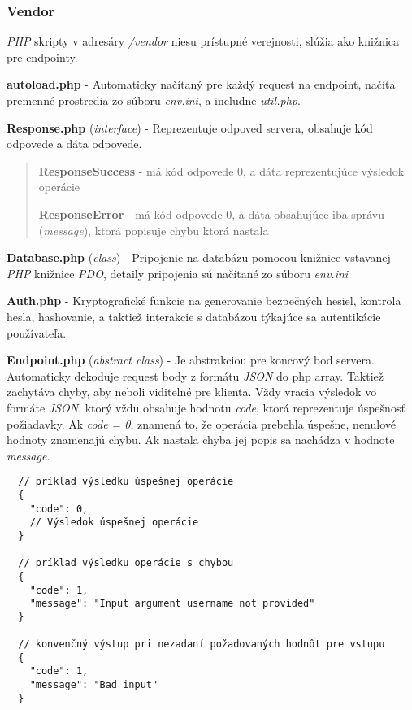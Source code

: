 \documentclass{article}
\newcommand{\filedesc}[1]{\vspace{0.3cm} \noindent \textbf{#1}}
\newcommand{\file}[1]{\emph{#1}}
\begin{document}
\subsubsection{Vendor}


\emph{PHP} skripty v adresáry \file{/vendor} niesu prístupné verejnosti, slúžia ako knižnica pre endpointy.

\filedesc{autoload.php} - Automaticky načítaný pre každý request na endpoint, načíta premenné prostredia zo súboru \file{env.ini}, a includne \file{util.php}.

\filedesc{Response.php} (\emph{interface}) - Reprezentuje odpoveď servera, obsahuje kód odpovede a dáta odpovede.
\begin{quote}
  \filedesc{ResponseSuccess} - má kód odpovede 0, a dáta reprezentujúce výsledok operácie

  \filedesc{ResponseError} - má kód odpovede 0, a dáta obsahujúce iba správu (\emph{message}), ktorá popisuje chybu ktorá nastala
\end{quote}

\filedesc{Database.php} (\emph{class}) - Pripojenie na databázu pomocou knižnice vstavanej \emph{PHP} knižnice \emph{PDO}, detaily pripojenia sú načítané zo súboru \file{env.ini}

\filedesc{Auth.php} - Kryptografické funkcie na generovanie bezpečných hesiel, kontrola hesla, hashovanie, a taktiež interakcie s databázou týkajúce sa autentikácie používateľa.

\filedesc{Endpoint.php} (\emph{abstract class}) - Je abstrakciou pre koncový bod servera. Automaticky dekoduje request body z formátu \emph{JSON} do php array. Taktiež zachytáva chyby, aby neboli viditelné pre klienta. Vždy vracia výsledok vo formáte \emph{JSON}, ktorý vždu obsahuje hodnotu \emph{code}, ktorá reprezentuje úspešnosť požiadavky. Ak \emph{code = 0}, znamená to, že operácia prebehla úspešne, nenulové hodnoty znamenajú chybu. Ak nastala chyba jej popis sa nachádza v hodnote \emph{message}.

\begin{verbatim}
  // príklad výsledku úspešnej operácie
  {
    "code": 0,
    // Výsledok úspešnej operácie 
  }

  // príklad výsledku operácie s chybou
  {
    "code": 1,
    "message": "Input argument username not provided"
  }

  // konvenčný výstup pri nezadaní požadovaných hodnôt pre vstupu
  {
    "code": 1,
    "message": "Bad input"
  }
\end{verbatim}
\end{document}
